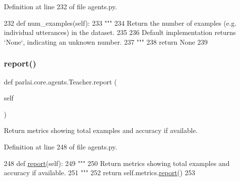 Definition at line 232 of file agents.\+py.


\begin{DoxyCode}
232     \textcolor{keyword}{def }num\_examples(self):
233         \textcolor{stringliteral}{"""}
234 \textcolor{stringliteral}{        Return the number of examples (e.g. individual utterances) in the dataset.}
235 \textcolor{stringliteral}{}
236 \textcolor{stringliteral}{        Default implementation returns `None`, indicating an unknown number.}
237 \textcolor{stringliteral}{        """}
238         \textcolor{keywordflow}{return} \textcolor{keywordtype}{None}
239 
\end{DoxyCode}
\mbox{\label{classparlai_1_1core_1_1agents_1_1Teacher_aa0afab11fb5f3f26ac59576f064623a4}} 
\subsubsection{\texorpdfstring{report()}{report()}}
{\footnotesize\ttfamily def parlai.\+core.\+agents.\+Teacher.\+report (\begin{DoxyParamCaption}\item[{}]{self }\end{DoxyParamCaption})}

\begin{DoxyVerb}Return metrics showing total examples and accuracy if available.
\end{DoxyVerb}
 

Definition at line 248 of file agents.\+py.


\begin{DoxyCode}
248     \textcolor{keyword}{def }\hyperlink{namespaceprojects_1_1convai2_1_1eval__f1_a01a47b9c08dad189837a51f085defc45}{report}(self):
249         \textcolor{stringliteral}{"""}
250 \textcolor{stringliteral}{        Return metrics showing total examples and accuracy if available.}
251 \textcolor{stringliteral}{        """}
252         \textcolor{keywordflow}{return} self.metrics.\hyperlink{namespaceprojects_1_1convai2_1_1eval__f1_a01a47b9c08dad189837a51f085defc45}{report}()
253 
\end{DoxyCode}
\mbox{\label{classparlai_1_1core_1_1agents_1_1Teacher_a3b1fe4cf4ea53c9b2ce28435391ad081}} 
